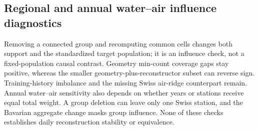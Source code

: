 \subsection{Regional and annual water--air influence diagnostics}

Removing a connected group and recomputing common cells changes both support and the standardized target population; it is an influence check, not a fixed-population causal contrast. Geometry min-count coverage gaps stay positive, whereas the smaller geometry-plus-reconstructor subset can reverse sign. Training-history imbalance and the missing Swiss air-ridge counterpart remain. Annual water--air sensitivity also depends on whether years or stations receive equal total weight. A group deletion can leave only one Swiss station, and the Bavarian aggregate change masks group influence. None of these checks establishes daily reconstruction stability or equivalence.

\begin{table}[t]\centering\small

\caption{Influence checks. Panel A shows FOEN-minus-Bavaria coverage gaps in percentage points using min-count weights; group deletion recomputes common support. Panel B shows after-minus-before-2010 within-station annual slopes; equal-station weighting changes the target relative to equal annual observations. Deletion ranges are not confidence intervals.}

\label{tab:region-water-experiment-influence}


\end{table}

